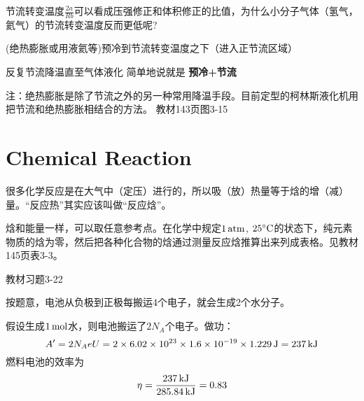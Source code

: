 \documentclass[CJK]{beamer}
\begin{document}
\begin{frame}
\bch
{}

节流转变温度$\frac{2a}{Rb}$可以看成压强修正和体积修正的比值，为什么小分子气体（氢气，氦气）的节流转变温度反而更低呢?

\ech
\end{frame}




\begin{frame}
\bch
{}
\bitem
\item{(绝热膨胀或用液氦等)预冷到节流转变温度之下（进入正节流区域）}
\item{反复节流降温直至气体液化}
\eitem
简单地说就是 {\bf 预冷+节流}

{\scriptsize 注：绝热膨胀是除了节流之外的另一种常用降温手段。目前定型的柯林斯液化机用把节流和绝热膨胀相结合的方法。}
\emini
{}
教材143页图3-15

\emini

\ech
\end{frame}

\section{Chemical Reaction}

\begin{frame}
\bch
很多化学反应是在大气中（定压）进行的，所以吸（放）热量等于焓的增（减）量。“反应热”其实应该叫做“反应焓”。

\skiplines

焓和能量一样，可以取任意参考点。在化学中规定$1\,\mathrm{atm}$, $25^\circ \mathrm{C}$的状态下，纯元素物质的焓为零，然后把各种化合物的焓通过测量反应焓推算出来列成表格。见教材145页表3-3。

\ech
\end{frame}

\begin{frame}
\bch
{\blue 教材习题3-22}

按题意，电池从负极到正极每搬运4个电子，就会生成2个水分子。

假设生成$1\,\mathrm{mol}$水，则电池搬运了$2N_A$个电子。做功：
$$A' = 2N_A eU = 2\times 6.02\times 10^{23}\times 1.6\times 10^{-19} \times 1.229 \,\mathrm{J} = 237 \,\mathrm{kJ}$$
燃料电池的效率为
$$\eta = \frac{237\,\mathrm{kJ}}{285.84\,\mathrm{kJ}} =0.83$$ 
\ech
\end{frame}
\end{document}
